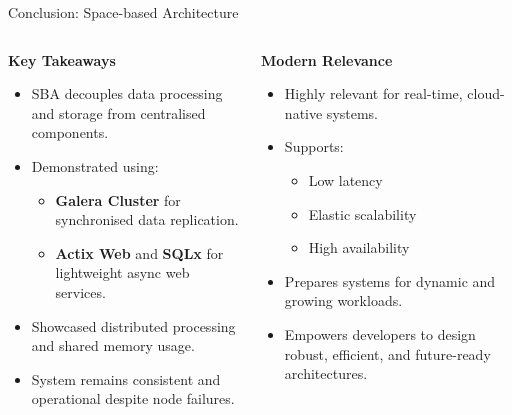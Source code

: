 \documentclass[aspectratio=169, table]{beamer}
\begin{document}
	\begin{frame}{Conclusion: Space-based Architecture}
		\vspace{20pt}
		\begin{columns}[t]
			\begin{column}{0.5\textwidth}
				\textbf{Key Takeaways}
				\begin{itemize}
					\item SBA decouples data processing and storage from centralised components.
					\item Demonstrated using:
					\begin{itemize}
						\item \textbf{Galera Cluster} for synchronised data replication.
						\item \textbf{Actix Web} and \textbf{SQLx} for lightweight async web services.
					\end{itemize}
					\item Showcased distributed processing and shared memory usage.
					\item System remains consistent and operational despite node failures.
				\end{itemize}
			\end{column}
			
			\begin{column}{0.5\textwidth}
				\textbf{Modern Relevance}
				\begin{itemize}
					\item Highly relevant for real-time, cloud-native systems.
					\item Supports:
					\begin{itemize}
						\item Low latency
						\item Elastic scalability
						\item High availability
					\end{itemize}
					\item Prepares systems for dynamic and growing workloads.
					\item Empowers developers to design robust, efficient, and future-ready architectures.
				\end{itemize}
			\end{column}
		\end{columns}
	\end{frame}
	
	
\end{document}
